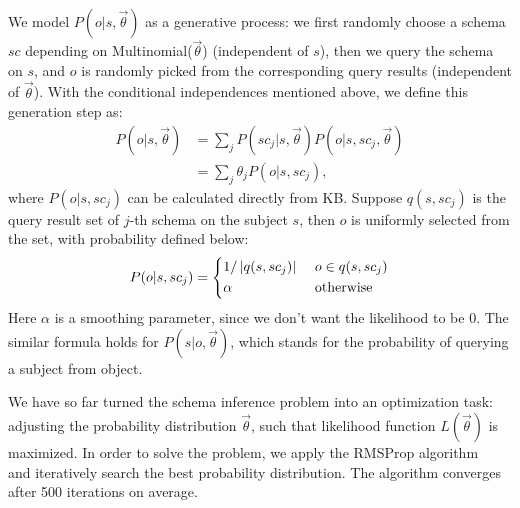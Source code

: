 We model $P(o | s, \vec{\theta})$ as a generative process:
we first randomly choose a schema $sc$ depending on Multinomial($\vec{\theta}$) (independent of $s$),
then we query the schema on $s$, and $o$ is randomly picked from the corresponding query results (independent of $\vec{\theta}$).
With the conditional independences mentioned above, 
we define this generation step as:
\begin{equation}
\label{eqn:score-def}
\begin{aligned}
P(o|s,\vec{\theta})	& = \sum\nolimits_{j} {P(sc_j | s, \vec{\theta}) P(o | s, sc_j, \vec{\theta})} \\
					& = \sum\nolimits_{j} {\theta_j P(o | s, sc_j)},
\end{aligned}
\end{equation}
\noindent
where $P(o | s, sc_j)$ can be calculated directly from KB.
Suppose $q(s, sc_j)$ is the query result set of $j$-th schema on
the subject $s$, then $o$ is uniformly selected from the set,
with probability defined below:
\begin{equation}
P(o | s, sc_j) = \left\{
  \begin{aligned}
  & 1 / \left| q(s, sc_j) \right| & ~ & o \in q(s, sc_j) \\
  & \alpha & ~ & \rm{otherwise} \\
  \end{aligned}
\right.
\end{equation}
\noindent
Here $\alpha$ is a smoothing parameter,
since we don't want the likelihood to be 0.
The similar formula holds for $P(s | o, \vec{\theta})$,
which stands for the probability of querying a subject from object.

We have so far turned the schema inference problem into an optimization task:
adjusting the probability distribution $\vec{\theta}$,
such that likelihood function $L(\vec{\theta})$ is maximized.
In order to solve the problem, we apply the RMSProp
algorithm~\cite{tieleman2012lecture}
and iteratively search the best probability distribution.
The algorithm converges after 500 iterations on average.

